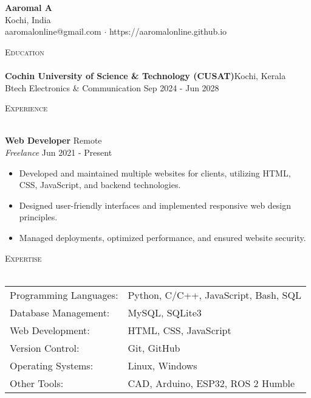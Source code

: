 \documentclass[a4paper]{article}
\newcommand{\lineunder} {
    \vspace*{-8pt} \\
    \hspace*{-18pt} \hrulefill \\
}
\newcommand{\header} [1] {
    {\hspace*{-18pt}\vspace*{6pt} \textsc{#1}}
    \vspace*{-6pt} \lineunder
}
\newcommand{\contact} [3] {
    \vspace*{20pt} %
    \begin{center}
        {\Huge \textbf{#1}}\\
        \vspace{5pt} %
        #2 \\ #3
    \end{center}
    \vspace*{-8pt}
}
\begin{document}
\vspace*{-40pt}

\vspace*{-10pt}
\contact{Aaromal A}{Kochi, India}{aaromalonline@gmail.com $\cdot$ https://aaromalonline.github.io}

\header{Education}
\textbf{Cochin University of Science \& Technology (CUSAT)}\hfill Kochi, Kerala\\
Btech Electronics \& Communication \hfill Sep 2024 - Jun 2028\\
\vspace{2mm}

\header{Experience}
\vspace{1mm}

\textbf{Web Developer} \hfill Remote\\
\textit{Freelance} \hfill Jun 2021 - Present\\
\vspace{-1mm}
\begin{itemize} \itemsep 1pt
    \item Developed and maintained multiple websites for clients, utilizing HTML, CSS, JavaScript, and backend technologies.
    \item Designed user-friendly interfaces and implemented responsive web design principles.
    \item Managed deployments, optimized performance, and ensured website security.
\end{itemize}

\header{Expertise}
\begin{tabular}{ l l }
    Programming Languages: & Python, C/C++, JavaScript, Bash, SQL\\
    Database Management: & MySQL, SQLite3\\
    Web Development: & HTML, CSS, JavaScript\\
    Version Control: & Git, GitHub\\
    Operating Systems: & Linux, Windows\\
    Other Tools: & CAD, Arduino, ESP32, ROS 2 Humble\\
\end{tabular}
\vspace{2mm}
\end{document}
